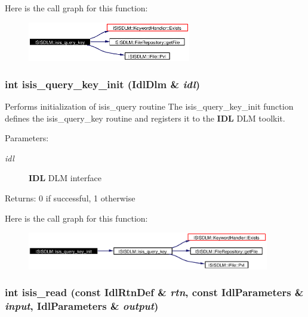 Here is the call graph for this function:\begin{figure}[H]
\begin{center}
\leavevmode
\includegraphics[width=202pt]{namespaceISISDLM_a25_cgraph}
\end{center}
\end{figure}
\subsubsection{\setlength{\rightskip}{0pt plus 5cm}int isis\_\-query\_\-key\_\-init (Idl\-Dlm \& {\em idl})}\label{namespaceISISDLM_a24}


Performs initialization of isis\_\-query routine The isis\_\-query\_\-key\_\-init function defines the isis\_\-query\_\-key routine and registers it to the {\bf IDL} DLM toolkit. \begin{Desc}
\item[Parameters:]
\begin{description}
\item[{\em idl}]{\bf IDL} DLM interface \end{description}
\end{Desc}
\begin{Desc}
\item[Returns:]0 if successful, 1 otherwise \end{Desc}


Here is the call graph for this function:\begin{figure}[H]
\begin{center}
\leavevmode
\includegraphics[width=299pt]{namespaceISISDLM_a24_cgraph}
\end{center}
\end{figure}
\subsubsection{\setlength{\rightskip}{0pt plus 5cm}int isis\_\-read (const Idl\-Rtn\-Def \& {\em rtn}, const Idl\-Parameters \& {\em input}, Idl\-Parameters \& {\em output})}\label{namespaceISISDLM_a27}


